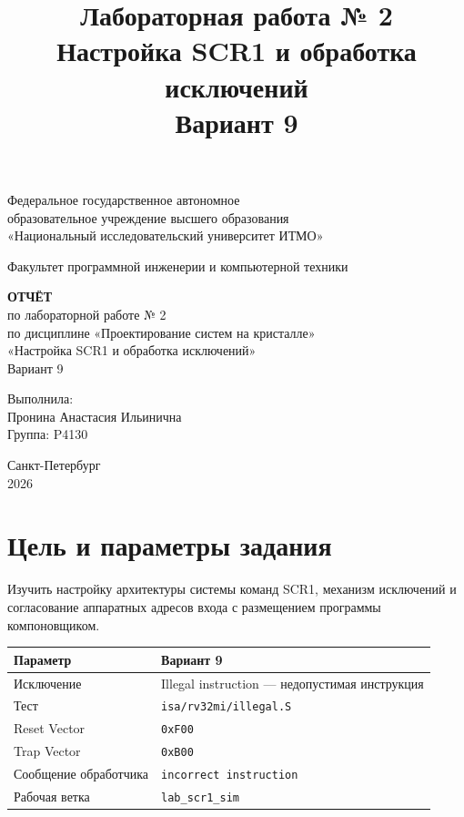 \documentclass[12pt,a4paper]{article}
\title{Лабораторная работа № 2\\[4mm]\large Настройка SCR1 и обработка исключений\\Вариант 9}
\author{}
\date{}
\begin{document}
\begin{titlepage}
\thispagestyle{empty}
\begingroup
{}
\fontsize{14}{25}\selectfont
\begin{center}
Федеральное государственное автономное\\
образовательное учреждение высшего образования\\
«Национальный исследовательский университет ИТМО»

\vspace{10mm}
Факультет программной инженерии и компьютерной техники

\vspace{34mm}
\textbf{ОТЧЁТ}\\
по лабораторной работе № 2\\
по дисциплине «Проектирование систем на кристалле»\\
«Настройка SCR1 и обработка исключений»\\
Вариант 9
\end{center}

\vspace{43mm}
\begin{flushright}
Выполнила:\\
Пронина Анастасия Ильинична\\
Группа: P4130
\end{flushright}

\vfill
\begin{center}
Санкт-Петербург\\
2026
\end{center}
\endgroup
\end{titlepage}
\restoregeometry
\setcounter{page}{2}

\section{Цель и параметры задания}
Изучить настройку архитектуры системы команд SCR1, механизм исключений и
согласование аппаратных адресов входа с размещением программы компоновщиком.

\begin{center}
\begin{tabular}{ll}
\toprule
Параметр & Вариант 9 \\
\midrule
Исключение & Illegal instruction --- недопустимая инструкция \\
Тест & \texttt{isa/rv32mi/illegal.S} \\
Reset Vector & \texttt{0xF00} \\
Trap Vector & \texttt{0xB00} \\
Сообщение обработчика & \texttt{incorrect instruction} \\
Рабочая ветка & \texttt{lab\_scr1\_sim} \\
\bottomrule
\end{tabular}
\end{center}
\end{document}
